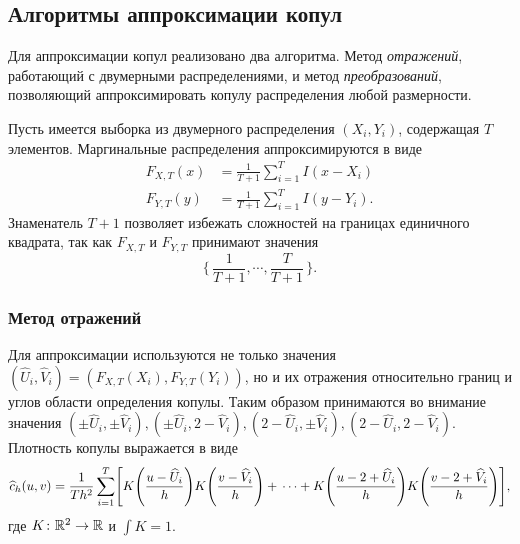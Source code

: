 \subsection*{Алгоритмы аппроксимации копул}

Для аппроксимации копул реализовано два алгоритма. Метод \emph{отражений}\cite{charpentier2007estimation}, работающий с двумерными распределениями, и метод \emph{преобразований}\cite{charpentier2007estimation}, позволяющий аппроксимировать копулу распределения любой размерности.

Пусть имеется выборка из двумерного распределения $(X_i, Y_i)$, содержащая $T$ элементов. Маргинальные распределения аппроксимируются в виде
\begin{align}
F_{X, T}(x) &= \frac{1}{T+1} \sum_{i=1}^T I(x - X_i) \\
F_{Y, T}(y) &= \frac{1}{T+1} \sum_{i=1}^T I(y - Y_i).
\end{align}
Знаменатель $T+1$ позволяет избежать сложностей на границах единичного квадрата, так как $F_{X, T}$ и $F_{Y, T}$ принимают значения
\[
\{\, \frac{1}{T+1}, \cdots, \frac{T}{T+1} \,\}.
\]

\subsubsection*{Метод отражений}

Для аппроксимации используются не только значения $(\widehat{U}_i, \widehat{V}_i) = (F_{X, T}(X_i), F_{Y, T}(Y_i))$, но и их отражения относительно границ и углов области определения копулы. Таким образом принимаются во внимание значения $(\pm\widehat{U}_i, \pm\widehat{V}_i), (\pm\widehat{U}_i, 2 - \widehat{V}_i), (2 - \widehat{U}_i, \pm\widehat{V}_i), (2 - \widehat{U}_i, 2 - \widehat{V}_i)$. Плотность копулы выражается в виде
\begin{equation}
  \widehat{c}_h(u, v)
  = \frac{1}{T h^2} \sum_{i=1}^T \sqts*{K\brts*{\frac{u - \widehat{U}_i}{h}}K\brts*{\frac{v - \widehat{V}_i}{h}} + \\
  \cdots + K\brts*{\frac{u - 2 + \widehat{U}_i}{h}}K\brts*{\frac{v - 2 + \widehat{V}_i}{h}}
  },
\end{equation}
где $K \colon \mathbb{R}^2 \to \mathbb{R}$ и $\int K = 1$.

